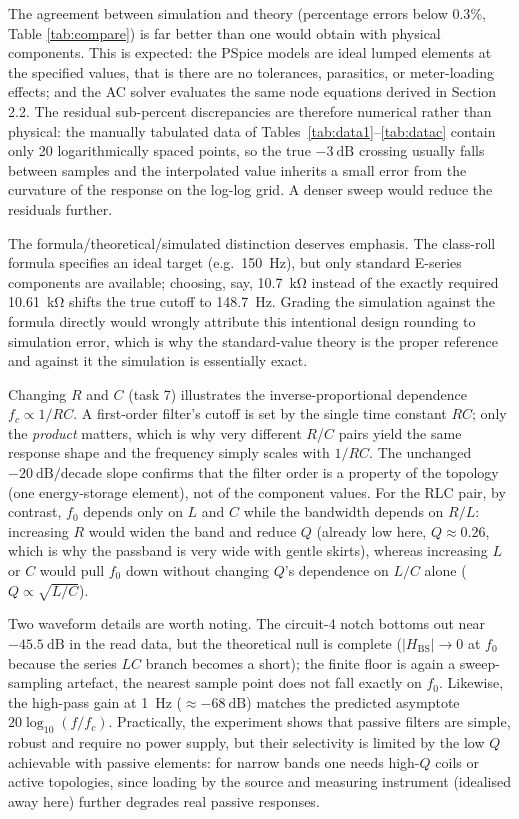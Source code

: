 \documentclass[12pt,a4paper]{article}
\begin{document}
	The agreement between simulation and theory (percentage errors below
	$0.3\%$, Table \ref{tab:compare}) is far better than one would obtain
	with physical components. This is expected: the PSpice models are
	ideal lumped elements at the specified values, that is there are no
	tolerances, parasitics, or meter-loading effects; and the AC solver
	evaluates the same node equations derived in Section 2.2. The
	residual sub-percent discrepancies are therefore numerical rather
	than physical: the manually tabulated data of Tables~\ref{tab:data1}--\ref{tab:datac} contain only 20 logarithmically spaced
	points, so the true $-3\ \mathrm{dB}$ crossing usually falls between
	samples and the interpolated value inherits a small error from the
	curvature of the response on the log-log grid. A denser sweep would
	reduce the residuals further.
	
	The formula/theoretical/simulated distinction deserves emphasis. The
	class-roll formula specifies an ideal target (e.g.\ \SI{150}{\hertz}),
	but only standard E-series components are available; choosing, say,
	\SI{10.7}{\kilo\ohm} instead of the exactly required
	\SI{10.61}{\kilo\ohm} shifts the true cutoff to \SI{148.7}{\hertz}.
	Grading the simulation against the formula directly would wrongly
	attribute this intentional design rounding to simulation error, which
	is why the standard-value theory is the proper reference and
	against it the simulation is essentially exact.
	
	Changing $R$ and $C$ (task 7) illustrates the inverse-proportional
	dependence $f_c \propto 1/RC$. A first-order filter's cutoff is set by
	the single time constant $RC$; only the \emph{product} matters, which
	is why very different $R$/$C$ pairs yield the same response shape and
	the frequency simply scales with $1/RC$. The unchanged
	$-20\ \mathrm{dB/decade}$ slope confirms that the filter order is a
	property of the topology (one energy-storage element), not of the
	component values. For the RLC pair, by contrast, $f_0$ depends only on
	$L$ and $C$ while the bandwidth depends on $R/L$: increasing $R$ would
	widen the band and reduce $Q$ (already low here, $Q \approx 0.26$,
	which is why the passband is very wide with gentle skirts), whereas
	increasing $L$ or $C$ would pull $f_0$ down without changing $Q$'s
	dependence on $L/C$ alone ($Q \propto \sqrt{L/C}$).
	
	Two waveform details are worth noting. The circuit-4 notch bottoms out
	near $-45.5\ \mathrm{dB}$ in the read data, but the theoretical null is
	complete ($|H_{\mathrm{BS}}|\to 0$ at $f_0$ because the series $LC$
	branch becomes a short); the finite floor is again a sweep-sampling
	artefact, the nearest sample point does not fall exactly on $f_0$.
	Likewise, the high-pass gain at \SI{1}{\hertz} ($\approx -68\ \mathrm{dB}$)
	matches the predicted asymptote $20\log_{10}(f/f_c)$. Practically,
	the experiment shows that passive filters are simple, robust and
	require no power supply, but their selectivity is limited by the
	low $Q$ achievable with passive elements: for narrow bands one needs
	high-$Q$ coils or active topologies, since loading by the source and
	measuring instrument (idealised away here) further degrades real
	passive responses.
	
\end{document}
